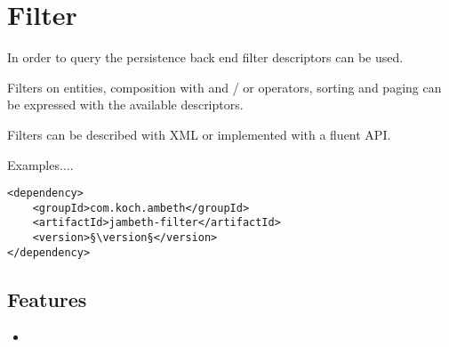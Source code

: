 \section{Filter}
\label{module:Filter}
\ClearAPI
In order to query the persistence back end filter descriptors can be used. 

Filters on entities, composition with and / or operators, sorting and paging can be expressed with the available descriptors.

Filters can be described with XML or implemented with a fluent API.

\TODO Examples....

\begin{lstlisting}[style=POM,caption={Maven modules to use \emph{Ambeth Filter}}]
<dependency>
	<groupId>com.koch.ambeth</groupId>
	<artifactId>jambeth-filter</artifactId>
	<version>§\version§</version>
</dependency>
\end{lstlisting}
\subsection{Features}
\begin{itemize}
	\item \TODO
\end{itemize}

